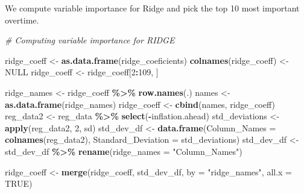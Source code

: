 \documentclass[
]{article}
\newenvironment{Shaded}{\begin{snugshade}}{\end{snugshade}}
\newcommand{\AttributeTok}[1]{\textcolor[rgb]{0.13,0.29,0.53}{#1}}
\newcommand{\CommentTok}[1]{\textcolor[rgb]{0.56,0.35,0.01}{\textit{#1}}}
\newcommand{\ConstantTok}[1]{\textcolor[rgb]{0.56,0.35,0.01}{#1}}
\newcommand{\DecValTok}[1]{\textcolor[rgb]{0.00,0.00,0.81}{#1}}
\newcommand{\FunctionTok}[1]{\textcolor[rgb]{0.13,0.29,0.53}{\textbf{#1}}}
\newcommand{\NormalTok}[1]{#1}
\newcommand{\OtherTok}[1]{\textcolor[rgb]{0.56,0.35,0.01}{#1}}
\newcommand{\SpecialCharTok}[1]{\textcolor[rgb]{0.81,0.36,0.00}{\textbf{#1}}}
\newcommand{\StringTok}[1]{\textcolor[rgb]{0.31,0.60,0.02}{#1}}
\begin{document}
We compute variable importance for Ridge and pick the top 10 most
important overtime.

\begin{Shaded}
\begin{Highlighting}[]
\CommentTok{\# Computing variable importance for RIDGE}

\NormalTok{ridge\_coeff }\OtherTok{\textless{}{-}} \FunctionTok{as.data.frame}\NormalTok{(ridge\_coeficients)}
\FunctionTok{colnames}\NormalTok{(ridge\_coeff) }\OtherTok{\textless{}{-}} \ConstantTok{NULL}
\NormalTok{ridge\_coeff }\OtherTok{\textless{}{-}}\NormalTok{ ridge\_coeff[}\DecValTok{2}\SpecialCharTok{:}\DecValTok{109}\NormalTok{, ]}

\NormalTok{ridge\_names }\OtherTok{\textless{}{-}}\NormalTok{ ridge\_coeff }\SpecialCharTok{\%\textgreater{}\%}
    \FunctionTok{row.names}\NormalTok{(.)}
\NormalTok{names }\OtherTok{\textless{}{-}} \FunctionTok{as.data.frame}\NormalTok{(ridge\_names)}
\NormalTok{ridge\_coeff }\OtherTok{\textless{}{-}} \FunctionTok{cbind}\NormalTok{(names, ridge\_coeff)}
\NormalTok{reg\_data2 }\OtherTok{\textless{}{-}}\NormalTok{ reg\_data }\SpecialCharTok{\%\textgreater{}\%}
    \FunctionTok{select}\NormalTok{(}\SpecialCharTok{{-}}\NormalTok{inflation.ahead)}
\NormalTok{std\_deviations }\OtherTok{\textless{}{-}} \FunctionTok{apply}\NormalTok{(reg\_data2, }\DecValTok{2}\NormalTok{, sd)}
\NormalTok{std\_dev\_df }\OtherTok{\textless{}{-}} \FunctionTok{data.frame}\NormalTok{(}\AttributeTok{Column\_Names =} \FunctionTok{colnames}\NormalTok{(reg\_data2),}
    \AttributeTok{Standard\_Deviation =}\NormalTok{ std\_deviations)}
\NormalTok{std\_dev\_df }\OtherTok{\textless{}{-}}\NormalTok{ std\_dev\_df }\SpecialCharTok{\%\textgreater{}\%}
    \FunctionTok{rename}\NormalTok{(}\AttributeTok{ridge\_names =} \StringTok{"Column\_Names"}\NormalTok{)}

\NormalTok{ridge\_coeff }\OtherTok{\textless{}{-}} \FunctionTok{merge}\NormalTok{(ridge\_coeff, std\_dev\_df, }\AttributeTok{by =} \StringTok{"ridge\_names"}\NormalTok{,}
    \AttributeTok{all.x =} \ConstantTok{TRUE}\NormalTok{)}


\end{Highlighting}
\end{Shaded}
\end{document}
